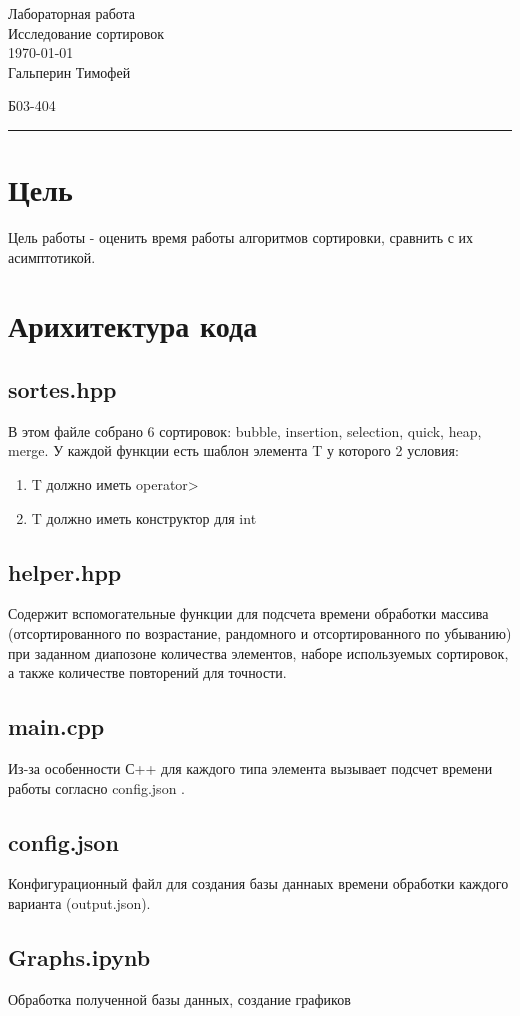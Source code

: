 \documentclass[12pt,onecolumn]{article}
\begin{document}
\begingroup  
    \centering
    \LARGE Лабораторная работа\\
    \LARGE Исследование сортировок\\[0.5em]
    \large \today\\[0.5em]
    \large Гальперин Тимофей\par
    \large Б03-404\par
\endgroup
\rule{\textwidth}{0.4pt}
\section{Цель}
Цель работы - оценить время работы алгоритмов сортировки, сравнить с их асимптотикой.
\section{Арихитектура кода}
\subsection{sortes.hpp}
В этом файле собрано 6 сортировок: bubble, insertion, selection, quick, heap, merge. У каждой функции есть шаблон элемента T у которого 2 условия:
\begin{enumerate}
    \item T должно иметь operator>
    \item T должно иметь конструктор для int
\end{enumerate}
\subsection{helper.hpp}
Содержит вспомогательные функции для подсчета времени обработки массива (отсортированного по возрастание, рандомного и отсортированного по убыванию) при заданном диапозоне количества элементов, наборе используемых сортировок, а также количестве повторений для точности.
\subsection{main.cpp}
Из-за особенности С++ для каждого типа элемента вызывает подсчет времени работы согласно config.json .
\subsection{config.json}
Конфигурационный файл для создания базы даннаых времени обработки каждого варианта (output.json).
\subsection{Graphs.ipynb}
Обработка полученной базы данных, создание графиков
\clearpage
\end{document}
